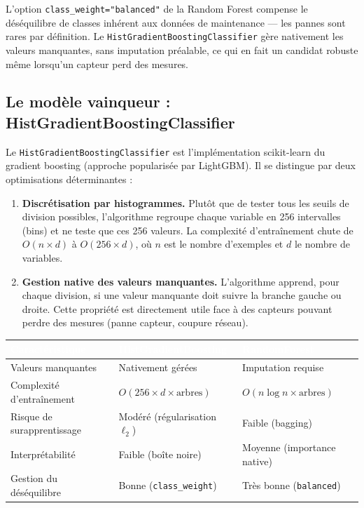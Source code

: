 \documentclass[11pt]{article}
\newcommand{\thead}[1]{\textbf{\textcolor{white}{#1}}}
\begin{document}
L'option \texttt{class\_weight="balanced"} de la Random Forest compense le
déséquilibre de classes inhérent aux données de maintenance --- les pannes sont
rares par définition. Le \texttt{HistGradientBoostingClassifier} gère nativement les
valeurs manquantes, sans imputation préalable, ce qui en fait un candidat robuste
même lorsqu'un capteur perd des mesures.

\subsection{Le modèle vainqueur : HistGradientBoostingClassifier}

Le \texttt{HistGradientBoostingClassifier} est l'implémentation scikit-learn du
gradient boosting (approche popularisée par LightGBM). Il se
distingue par deux optimisations déterminantes :

\begin{enumerate}[leftmargin=1.6em, itemsep=3pt, topsep=3pt]
    \item \textbf{Discrétisation par histogrammes.} Plutôt que de tester tous les
    seuils de division possibles, l'algorithme regroupe chaque variable en 256
    intervalles (bins) et ne teste que ces 256 valeurs. La complexité d'entraînement
    chute de $O(n \times d)$ à $O(256 \times d)$, où $n$ est le nombre d'exemples et
    $d$ le nombre de variables.
    \item \textbf{Gestion native des valeurs manquantes.} L'algorithme apprend, pour
    chaque division, si une valeur manquante doit suivre la branche gauche ou droite.
    Cette propriété est directement utile face à des capteurs pouvant perdre des
    mesures (panne capteur, coupure réseau).
\end{enumerate}

\begin{center}
\begin{tabularx}{\linewidth}{|l|>{\raggedright\arraybackslash}X|>{\raggedright\arraybackslash}X|}
\hline
\rowcolor{tableHeader}
\thead{Caractéristique} & \thead{HistGradientBoosting} & \thead{RandomForest} \\
\hline
Valeurs manquantes & Nativement gérées & Imputation requise \\
\hline
Complexité d'entraînement & $O(256 \times d \times \text{arbres})$ & $O(n \log n \times \text{arbres})$ \\
\hline
Risque de surapprentissage & Modéré (régularisation $\ell_2$) & Faible (bagging) \\
\hline
Interprétabilité & Faible (boîte noire) & Moyenne (importance native) \\
\hline
Gestion du déséquilibre & Bonne (\texttt{class\_weight}) & Très bonne (\texttt{balanced}) \\
\hline
\end{tabularx}
\end{center}
\end{document}
